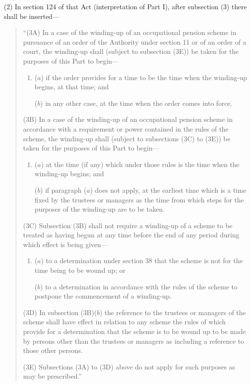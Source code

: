 \documentclass[12pt,a4paper]{article}
\begin{document}
(2) In section 124 of that Act (interpretation of Part I), after subsection (3)  there shall be inserted—
\begin{quotation}
“(3A) In a case of the winding-up of an occupational pension scheme in pursuance of an order of the Authority under section 11 or of an order of a court, the winding-up shall (subject to subsection (3E)) be taken for the purposes of this Part to begin—
\begin{enumerate}\item[]
($a$) if the order provides for a time to be the time when the winding-up begins, at that time; and

($b$) in any other case, at the time when the order comes into force.
\end{enumerate}

(3B) In a case of the winding-up of an occupational pension scheme in accordance with a requirement or power contained in the rules of the scheme, the winding-up shall (subject to subsections (3C)  to (3E)) be taken for the purposes of this Part to begin—
\begin{enumerate}\item[]
($a$) at the time (if any) which under those rules is the time when the winding-up begins; and

($b$) if paragraph ($a$)  does not apply, at the earliest time which is a time fixed by the trustees or managers as the time from which steps for the purposes of the winding-up are to be taken.
\end{enumerate}

(3C) Subsection (3B)  shall not require a winding-up of a scheme to be treated as having begun at any time before the end of any period during which effect is being given—
\begin{enumerate}\item[]
($a$) to a determination under section 38 that the scheme is not for the time being to be wound up; or

($b$) to a determination in accordance with the rules of the scheme to postpone the commencement of a winding-up.
\end{enumerate}

(3D) In subsection (3B)($b$)  the reference to the trustees or managers of the scheme shall have effect in relation to any scheme the rules of which provide for a determination that the scheme is to be wound up to be made by persons other than the trustees or managers as including a reference to those other persons.

(3E) Subsections (3A)  to (3D)  above do not apply for such purposes as may be prescribed.”
\end{quotation}
\end{document}
